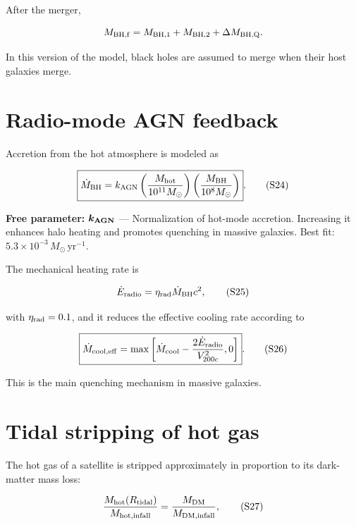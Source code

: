 \documentclass[11pt,a4paper]{article}
\newcommand{\freeparam}[2]{%
  \colorbox{freeblue}{\parbox{0.95\linewidth}{\textbf{Free parameter:} $\boldsymbol{#1}$ --- #2}}%
}
\begin{document}
After the merger,

\begin{equation}
 M_{\rm BH,f}=M_{\rm BH,1}+M_{\rm BH,2}+\Delta M_{\rm BH,Q}.
\end{equation}

In this version of the model, black holes are assumed to merge when their host galaxies merge.

\section{Radio-mode AGN feedback}
Accretion from the hot atmosphere is modeled as

\begin{equation}
 \boxed{\dot M_{\rm BH}=k_{\rm AGN}
 \left(\frac{M_{\rm hot}}{10^{11}M_\odot}\right)
 \left(\frac{M_{\rm BH}}{10^8M_\odot}\right)}.
 \tag{S24}
\end{equation}

\freeparam{k_{\rm AGN}}{Normalization of hot-mode accretion. Increasing it enhances halo heating and promotes quenching in massive galaxies. Best fit: $5.3\times10^{-3}\,M_\odot\,\mathrm{yr^{-1}}$.}

The mechanical heating rate is

\begin{equation}
 \dot E_{\rm radio}=\eta_{\rm rad}\dot M_{\rm BH}c^2,
 \tag{S25}
\end{equation}

with $\eta_{\rm rad}=0.1$, and it reduces the effective cooling rate according to

\begin{equation}
 \boxed{\dot M_{\rm cool,eff}=\max\left[
 \dot M_{\rm cool}-\frac{2\dot E_{\rm radio}}{V_{200c}^2},0
 \right]}.
 \tag{S26}
\end{equation}

This is the main quenching mechanism in massive galaxies.

\section{Tidal stripping of hot gas}
The hot gas of a satellite is stripped approximately in proportion to its dark-matter mass loss:

\begin{equation}
 \frac{M_{\rm hot}(R_{\rm tidal})}{M_{\rm hot,infall}}
 =\frac{M_{\rm DM}}{M_{\rm DM,infall}},
 \tag{S27}
\end{equation}
\end{document}
